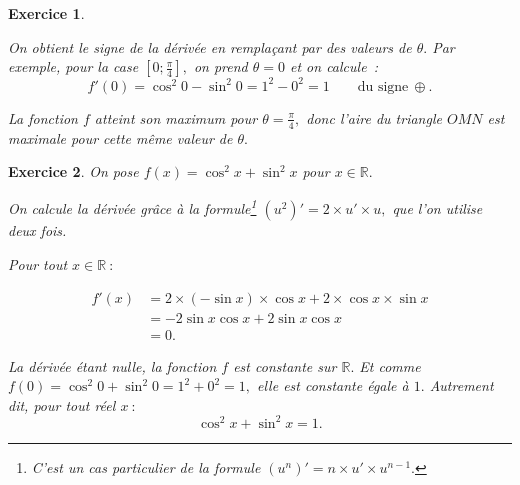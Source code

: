 \documentclass[10pt]{article}
\newtheorem{exo}{Exercice}
\begin{document}
\begin{exo}
\begin{multicols}{2}
On obtient le signe de la dérivée en remplaçant par des valeurs de $\theta.$ Par exemple, pour la case $\left[0;\frac{\pi}{4}\right],$ on prend $\theta=0$ et on calcule~:
\[f'(0)=\cos^2 0-\sin^2 0=1^2-0^2=1\qquad\text{du signe}~\oplus.\]

\end{multicols}

\medskip


La fonction $f$ atteint son maximum pour $\theta=\frac{\pi}{4},$ donc l'aire du triangle $OMN$ est maximale pour cette même valeur de $\theta.$



\end{exo}
\begin{exo}

 On pose $f(x)= \cos^2 x+\sin^2 x$ pour $x\in\mathbb{R}.$

\medskip

On calcule la dérivée grâce à la formule\footnote{C'est un cas particulier de la formule $\left(u^n\right)'=n\times u'\times u^{n-1}.$} $\left(u^2\right)'=2\times u'\times u,$  que l'on utilise deux fois.

Pour tout $x\in\mathbb{R}~:$


\begin{align*}
f'(x)&=2\times (-\sin x)\times \cos x +2\times \cos x\times \sin x
\\&=-2\sin x\cos x+2\sin x\cos x
\\&=0.
\end{align*}

\medskip

La dérivée étant nulle, la fonction $f$ est constante sur $\mathbb{R}.$ Et comme 
$f(0)=\cos^2 0+\sin^2 0=1^2+0^2=1,$ elle est constante égale à $1.$ Autrement dit, pour tout réel $x~:$
\[\cos^2 x+\sin^2 x=1.\]



\end{exo}
\end{document}
